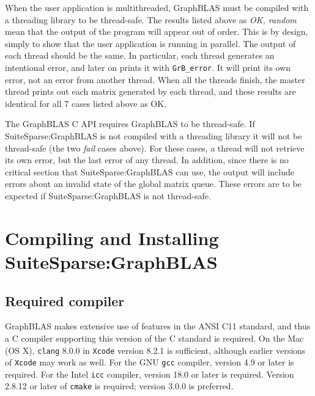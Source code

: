 \documentclass[12pt]{article}
\begin{document}
\noindent
When the user application is multithreaded, GraphBLAS must be compiled with a
threading library to be thread-safe.  The results listed above as {\em OK,
random} mean that the output of the program will appear out of order.  This is
by design, simply to show that the user application is running in parallel.
The output of each thread should be the same.  In particular, each thread
generates an intentional error, and later on prints it with \verb'GrB_error'.
It will print its own error, not an error from another thread.  When all the
threads finish, the master thread prints out each matrix generated by each
thread, and these results are identical for all 7 cases listed above as OK.

The GraphBLAS C API requires GraphBLAS to be thread-safe.  If
SuiteSparse:GraphBLAS is not compiled with a threading library it will not be
thread-safe (the two {\em fail} cases above).  For these cases, a thread will
not retrieve its own error, but the last error of any thread.  In addition,
since there is no critical section that SuiteSparse:GraphBLAS can use, the
output will include errors about an invalid state of the global matrix queue.
These errors are to be expected if SuiteSparse:GraphBLAS is not thread-safe.

\newpage
\section{Compiling and Installing SuiteSparse:GraphBLAS}
\label{sec:install}

\subsection{Required compiler}

GraphBLAS makes extensive use of features in the ANSI C11 standard, and thus a
C compiler supporting this version of the C standard is required.  On the Mac
(OS X), \verb'clang' 8.0.0 in \verb'Xcode' version 8.2.1 is sufficient,
although earlier versions of \verb'Xcode' may work as well.  For the GNU
\verb'gcc' compiler, version 4.9 or later is required.  For the Intel
\verb'icc' compiler, version 18.0 or later is required.  Version 2.8.12 or
later of \verb'cmake' is required; version 3.0.0 is preferred.
\end{document}
